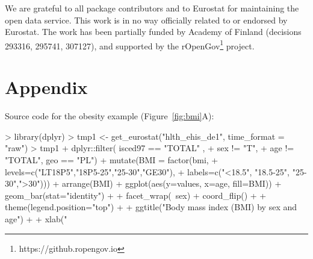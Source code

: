 We are grateful to all package contributors and to Eurostat for
maintaining the open data service. This work is in no way officially
related to or endorsed by Eurostat. The work has been partially funded
by Academy of Finland (decisions 293316, 295741, 307127), and
supported by the rOpenGov\footnote{https://github.ropengov.io}
project.




\address{Leo Lahti\\
  Department of Mathematics and Statistics\\
  PO Box 20014 University of Turku\\
  Finland\\}

\address{Janne Huovari\\
  Pellervo Economic Research PTT\\
  Eerikinkatu 28 A 00180 Helsinki\\
  Finland\\}

\address{Markus Kainu\\
  Research Department, The Social Insurance Institution of Finland\\
  PO Box 450, 00101 Helsinki\\
  Finland\\}

\address{Przemyslaw Biecek\\
  Faculty of Mathematics, Informatics, and Mechanics\\
  University of Warsaw\\
  Banacha 2, 02-097 Warsaw\\
  Poland\\}

\newpage

\section{Appendix}

Source code for the obesity example (Figure~\ref{fig:bmi}A):

\begin{example}
> library(dplyr)
> tmp1 <- get_eurostat("hlth_ehis_de1", time_format = "raw")
> tmp1 %
+  dplyr::filter( isced97 == "TOTAL" ,
+          sex != "T",
+          age != "TOTAL", geo == "PL") %
+  mutate(BMI = factor(bmi, 
+                      levels=c("LT18P5","18P5-25","25-30","GE30"), 
+                      labels=c("<18.5", "18.5-25", "25-30",">30"))) %
+  arrange(BMI) %
+  ggplot(aes(y=values, x=age, fill=BMI)) + geom_bar(stat="identity") +
+  facet_wrap(~sex) + coord_flip() +
+  theme(legend.position="top") +
+  ggtitle("Body mass index (BMI) by sex and age") +
+  xlab("%
\end{example}


